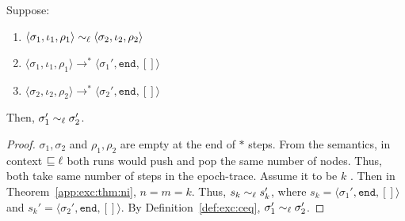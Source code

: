 \begin{mycor}
\label{app:exc:cor:ni}
Suppose:
\begin{enumerate}
\item $\langle \sigma_1, \iota_1, \rho_1 \rangle \sim_\ell
\langle \sigma_2, \iota_2, \rho_2\rangle$
\item $\langle \sigma_1, \iota_1, \rho_1 \rangle
  \rightarrow^{*} \langle \sigma_1', \texttt{end}, [] \rangle$
\item $\langle \sigma_2, \iota_2, \rho_2 \rangle \rightarrow^{*}
  \langle \sigma_2', \texttt{end}, []\rangle$
\end{enumerate}
Then, $\sigma_1' \sim_\ell \sigma_2'$.
\end{mycor}
\begin{proof}
$\sigma_1, \sigma_2$ and $\rho_1, \rho_2$ are empty at the end of $*$
steps. From the semantics, in context $\sqsubseteq \ell$
both runs would push and pop the same number of nodes. Thus, both take
same number of steps in the epoch-trace. Assume it to be $k$ . Then in
Theorem~\ref{app:exc:thm:ni}, $n = m = k$. Thus, $s_k \sim_\ell s_k'$, where
$s_k = \langle \sigma_1', \texttt{end}, []\rangle$ and $s_k' = \langle
\sigma_2', \texttt{end}, [] \rangle$. By Definition~\ref{def:exc:ceq},
$\sigma_1' \sim_\ell  \sigma_2'$.
\end{proof}
